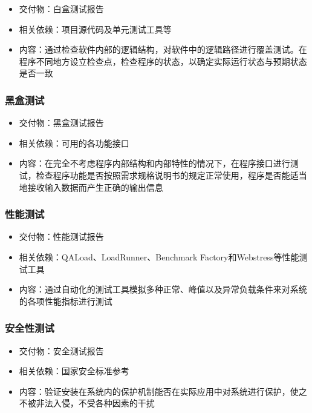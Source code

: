 \documentclass[hyperref, a4paper]{ctexart}
\providecommand{\tightlist}{%
  \setlength{\itemsep}{0pt}\setlength{\parskip}{0pt}}
\begin{document}
\begin{itemize}
\tightlist
\item
  交付物：白盒测试报告
\item
  相关依赖：项目源代码及单元测试工具等
\item
  内容：通过检查软件内部的逻辑结构，对软件中的逻辑路径进行覆盖测试。在程序不同地方设立检查点，检查程序的状态，以确定实际运行状态与预期状态是否一致
\end{itemize}

\hypertarget{ux9ed1ux76d2ux6d4bux8bd5}{%
\subsubsection{黑盒测试}\label{ux9ed1ux76d2ux6d4bux8bd5}}

\begin{itemize}
\tightlist
\item
  交付物：黑盒测试报告
\item
  相关依赖：可用的各功能接口
\item
  内容：在完全不考虑程序内部结构和内部特性的情况下，在程序接口进行测试，检查程序功能是否按照需求规格说明书的规定正常使用，程序是否能适当地接收输入数据而产生正确的输出信息
\end{itemize}

\hypertarget{ux6027ux80fdux6d4bux8bd5}{%
\subsubsection{性能测试}\label{ux6027ux80fdux6d4bux8bd5}}

\begin{itemize}
\tightlist
\item
  交付物：性能测试报告
\item
  相关依赖：QALoad、LoadRunner、Benchmark
  Factory和Webstress等性能测试工具
\item
  内容：通过自动化的测试工具模拟多种正常、峰值以及异常负载条件来对系统的各项性能指标进行测试
\end{itemize}

\hypertarget{ux5b89ux5168ux6027ux6d4bux8bd5}{%
\subsubsection{安全性测试}\label{ux5b89ux5168ux6027ux6d4bux8bd5}}

\begin{itemize}
\tightlist
\item
  交付物：安全测试报告
\item
  相关依赖：国家安全标准参考
\item
  内容：验证安装在系统内的保护机制能否在实际应用中对系统进行保护，使之不被非法入侵，不受各种因素的干扰
\end{itemize}
\end{document}

